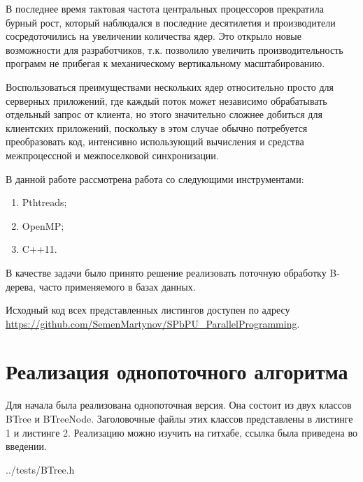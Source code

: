 \documentclass[a4paper, 12pt]{report}		%
\begin{document}
В последнее время тактовая частота центральных процессоров прекратила бурный рост, который наблюдался в последние десятилетия и производители сосредоточились на увеличении количества ядер. Это открыло новые возможности для разработчиков, т.к. позволило увеличить производительность программ не прибегая к механическому вертикальному масштабированию.
\vspace{1em}

Воспользоваться преимуществами нескольких ядер относительно просто для серверных приложений, где каждый поток может независимо обрабатывать отдельный запрос от клиента, но этого значительно сложнее добиться для клиентских приложений, поскольку в этом случае обычно потребуется преобразовать код, интенсивно использующий вычисления и средства межпроцессной и межпоселковой синхронизации.
\vspace{1em}

В данной работе рассмотрена работа со следующими инструментами:

\begin{enumerate}
    \item Pthtreads;
    \item OpenMP;
    \item C++11.
\end{enumerate}

В качестве задачи было принято решение реализовать поточную обработку B-дерева, часто применяемого в базах данных.

\vspace{1em}
Исходный код всех представленных листингов доступен по адресу \\ \url{https://github.com/SemenMartynov/SPbPU_ParallelProgramming}.


\chapter*{Реализация однопоточного алгоритма}

Для начала была реализована однопоточная версия. Она состоит из двух классов BTree и BTreeNode. Заголовочные файлы этих классов представлены в листинге 1 и листинге 2. Реализацию можно изучить на гитхабе, ссылка была приведена во введении.


{../tests/BTree.h}
\end{document}
